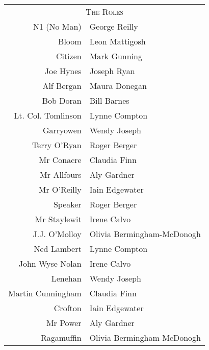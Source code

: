 \begin{tabular}{rl}
    \multicolumn{2}{c}{\Large \textsc{The Roles}} \\
N1 (No Man)         & George Reilly \\      %
Bloom               & Leon Mattigosh \\     %
Citizen             & Mark Gunning \\       %
Joe Hynes           & Joseph Ryan \\        %
Alf Bergan          & Maura Donegan \\      %

Bob Doran           & Bill Barnes \\        %
Lt. Col. Tomlinson  & Lynne Compton \\      %
Garryowen           & Wendy Joseph \\       %
Terry O'Ryan        & Roger Berger \\       %
Mr Conacre          & Claudia Finn \\       %
Mr Allfours         & Aly Gardner \\        %
Mr O'Reilly         & Iain Edgewater \\     %
Speaker             & Roger Berger \\       %
Mr Staylewit        & Irene Calvo \\        %
J.J. O'Molloy       & Olivia Bermingham-McDonogh \\ %
Ned Lambert         & Lynne Compton \\      %
John Wyse Nolan     & Irene Calvo \\        %
Lenehan             & Wendy Joseph \\       %
Martin Cunningham   & Claudia Finn \\       %
Crofton             & Iain Edgewater \\     %
Mr Power            & Aly Gardner \\        %
Ragamuffin          & Olivia Bermingham-McDonogh \\  %
\end{tabular}

